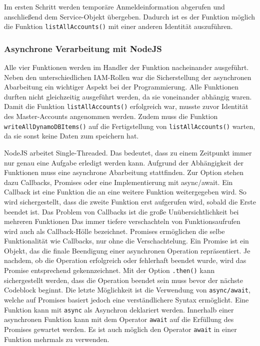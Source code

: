 Im ersten Schritt werden temporäre Anmeldeinformation abgerufen und anschließend dem Service-Objekt übergeben.
Dadurch ist es der Funktion möglich die Funktion \verb+listAllAccounts()+ mit einer anderen Identität auszuführen.

\subsubsection{Asynchrone Verarbeitung mit NodeJS}

Alle vier Funktionen werden im Handler der Funktion nacheinander ausgeführt.
Neben den unterschiedlichen IAM-Rollen war die Sicherstellung der asynchronen Abarbeitung ein wichtiger Aspekt bei der Programmierung.
Alle Funktionen durften nicht gleichzeitig ausgeführt werden, da sie voneinander abhängig waren.
Damit die Funktion \verb+listAllAccounts()+ erfolgreich war, musste zuvor Identität des Master-Accounts angenommen werden.
Zudem muss die Funktion \verb+writeAllDynamoDBItems()+ auf die Fertigstellung von \verb+listAllAccounts()+ warten, da sie sonst keine Daten zum speichern hat.

NodeJS arbeitet Single-Threaded.
Das bedeutet, dass zu einem Zeitpunkt immer nur genau eine Aufgabe erledigt werden kann.
Aufgrund der Abhängigkeit der Funktionen muss eine asynchrone Abarbeitung stattfinden.
Zur Option stehen dazu Callbacks, Promises oder eine Implementierung mit async/await.
Ein Callback ist eine Funktion die an eine weitere Funktion weitergegeben wird.
So wird sichergestellt, dass die zweite Funktion erst aufgerufen wird, sobald die Erste beendet ist.
Das Problem von Callbacks ist die große Unübersichtlichkeit bei mehreren Funktionen
Das immer tiefere verschachteln von Funktionsaufrufen wird auch als \glqq Callback-Hölle\grqq{} bezeichnet.
Promises ermöglichen die selbe Funktionalität wie Callbacks, nur ohne die Verschachtelung.
\glqq Ein Promise ist ein Objekt, das die finale Beendigung einer asynchronen Operation repräsentiert.
Je nachdem, ob die Operation erfolgreich oder fehlerhaft beendet wurde, wird das Promise entsprechend gekennzeichnet. \grqq{} \cite[]{Promises}
Mit der Option \verb+.then()+ kann sichergestellt werden, dass die Operation beendet sein muss bevor der nächste Codeblock beginnt.
Die letzte Möglichkeit ist die Verwendung von \verb+async/await+, welche auf Promises basiert jedoch eine verständlichere Syntax ermöglicht.
Eine Funktion kann mit \verb+async+ als Asynchron deklariert werden.
Innerhalb einer asynchronen Funktion kann mit dem Operator \verb+await+ auf die Erfüllung des Promises gewartet werden.
Es ist auch möglich den Operator \verb+await+ in einer Funktion mehrmals zu verwenden.

